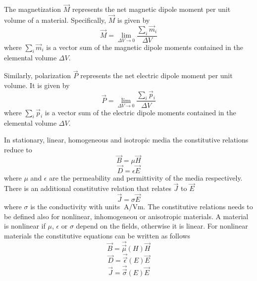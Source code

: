 \documentclass[12pt,a4paper,oneside]{book}
\begin{document}
\begin{onehalfspace}
The magnetization $\vec{M}$ represents the net magnetic dipole moment per unit volume of a material. Specifically, $\vec{M}$ is given by
 \begin{equation}\label{}
 	\vec{M}=\lim_{\Delta V\rightarrow 0}\frac{\sum_{i}\vec{m}_i}{\Delta V}
 \end{equation}
where $\sum_{i}\vec{m}_i$ is a vector sum of the magnetic dipole moments contained in the elemental volume $\Delta V$. 

Similarly, polarization $\vec{P}$ represents the net electric dipole moment per unit volume. It is given by
  \begin{equation}\label{}
 	\vec{P}=\lim_{\Delta V\rightarrow 0}\frac{\sum_{i}\vec{p}_i}{\Delta V}
 \end{equation}
where $\sum_{i}\vec{p}_i$ is a vector sum of the electric dipole moments contained in the elemental volume $\Delta V$.

In stationary, linear, homogeneous and isotropic media the constitutive relations reduce to
\begin{equation}\label{constitutive_3}
	\vec{B}=\mu\vec{H}
\end{equation}
\begin{equation}\label{constitutive_4}
	\vec{D}=\epsilon\vec{E}
\end{equation}
where $\mu$ and $\epsilon$ are the permeability and permittivity of the media respectively. There is an additional constitutive relation that relates $\vec{J}$ to $\vec{E}$
\begin{equation}\label{constitutive_5}
	\vec{J}=\sigma\vec{E}
\end{equation}
where $\sigma$ is the conductivity with units $\SI{}{\ampere\per\volt\meter}$.
The constitutive relations needs to be defined also for nonlinear, inhomogeneou or anisotropic materials. A material is nonlinear if $\mu$, $\epsilon$ or $\sigma$ depend on the fields, otherwise it is linear. For nonlinear materials the constitutive equations can be written as follows
\begin{equation}\label{constitutive_6}
	\vec{B}=\vec{\vec{\mu}}(H)\vec{H}
\end{equation}
\begin{equation}\label{constitutive_7}
	\vec{D}=\vec{\vec{\epsilon}}(E)\vec{E}
\end{equation}
\begin{equation}\label{constitutive_8}
	\vec{J}=\vec{\vec{\sigma}}(E)\vec{E}
\end{equation}

\end{onehalfspace}
\end{document}

